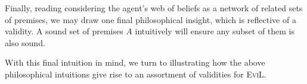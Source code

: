 
Finally, reading considering the agent's web of beliefs as a network
of related sets of premises, we may draw one final philosophical
insight, which is reflective of a validity.
A sound set of premises $A$ intuitively will ensure any subset of them
is also sound.

With this final intuition in mind, we turn to illustrating how
the above philosophical intuitions give rise to an assortment of
validities for \textsc{EviL}.

